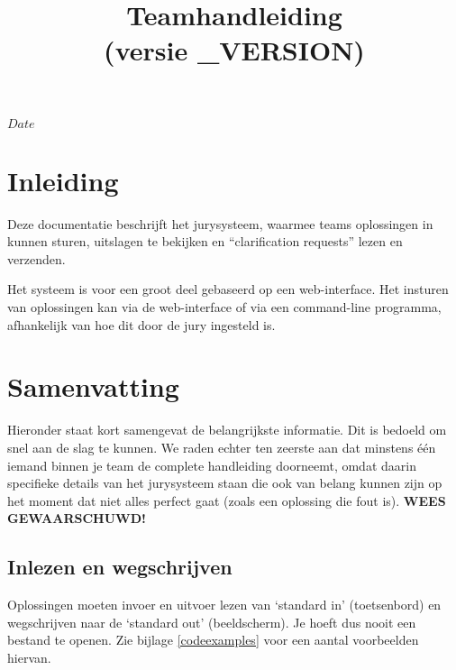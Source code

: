 

\usepackage[dutch]{babel}

\SVNdate $Date$

\title{Teamhandleiding \DOMjudge\\(versie \DOMJUDGE_VERSION)}



\begin{titlepage}
\maketitle
\end{titlepage}

\newpage
\tableofcontents

\newpage
\section{Inleiding}

Deze documentatie beschrijft het \DOMjudge
jurysysteem, waarmee teams oplossingen in kunnen
sturen, uitslagen te bekijken en ``clarification requests'' lezen
en verzenden.

Het systeem is voor een groot deel gebaseerd op een web-interface. Het
insturen van oplossingen kan via de web-interface of via een
command-line programma, afhankelijk van hoe dit door de jury
ingesteld is.

\section{Samenvatting}

Hieronder staat kort samengevat de belangrijkste informatie. Dit is
bedoeld om snel aan de slag te kunnen. We raden echter ten zeerste
aan dat minstens \'e\'en iemand binnen je team de complete handleiding
doorneemt, omdat daarin specifieke details van het jurysysteem staan
die ook van belang kunnen zijn op het moment dat niet alles perfect
gaat (zoals een oplossing die fout is). \textbf{WEES GEWAARSCHUWD!}

\subsection{Inlezen en wegschrijven}

Oplossingen moeten invoer en uitvoer lezen van `standard in'
(toetsenbord) en wegschrijven naar de `standard out' (beeldscherm).
Je hoeft dus nooit een bestand te openen. Zie bijlage
\ref{codeexamples} voor een aantal voorbeelden hiervan.

